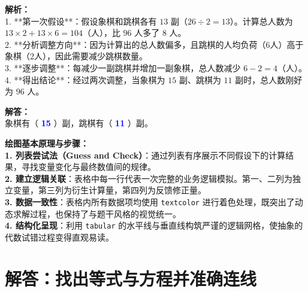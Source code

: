 \vspace{0.6cm}

{\small\color{gray}
\textbf{解析：}\\
1. **第一次假设**：假设象棋和跳棋各有 $13$ 副（$26 \div 2 = 13$）。计算总人数为 $13 \times 2 + 13 \times 6 = 104$（人），比 $96$ 人多了 $8$ 人。\\
2. **分析调整方向**：因为计算出的总人数偏多，且跳棋的人均负荷（6人）高于象棋（2人），因此需要减少跳棋数量。\\
3. **逐步调整**：每减少一副跳棋并增加一副象棋，总人数减少 $6 - 2 = 4$（人）。\\
4. **得出结论**：经过两次调整，当象棋为 $15$ 副、跳棋为 $11$ 副时，总人数刚好为 $96$ 人。
}

\vspace{0.4cm}
\noindent\textbf{解答：}\\
象棋有（ \textbf{\textcolor{blue}{15}} ）副，跳棋有（ \textbf{\textcolor{blue}{11}} ）副。

\vspace{0.6cm}

{\small\color{blue!70!black}
\textbf{绘图基本原理与步骤：}\\
\textbf{1. 列表尝试法（Guess and Check）}：通过列表有序展示不同假设下的计算结果，寻找变量变化与最终数值间的规律。\\
\textbf{2. 建立逻辑关联}：表格中每一行代表一次完整的业务逻辑模拟。第一、二列为独立变量，第三列为衍生计算量，第四列为反馈修正量。\\
\textbf{3. 数据一致性}：表格内所有数据项均使用 \texttt{textcolor} 进行着色处理，既突出了动态求解过程，也保持了与题干风格的视觉统一。\\
\textbf{4. 结构化呈现}：利用 \texttt{tabular} 的水平线与垂直线构筑严谨的逻辑网格，使抽象的代数试错过程变得直观易读。
}



\newpage



\newpage

\section{解答：找出等式与方程并准确连线}

\vspace{0.6cm}

